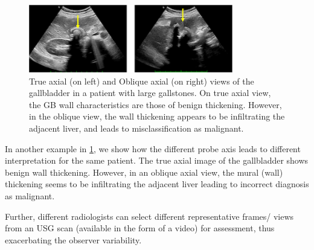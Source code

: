\begin{figure}[!ht]
    \centering
    \includegraphics[width=0.6\linewidth, height=8em]{figs/oblique_thickening.png}
    \caption[Viewpoint variation leading to incorrect diagnosis]{True axial (on left) and Oblique axial (on right) views of the gallbladder in a patient with large gallstones. On true axial view, the GB wall characteristics are those of benign thickening. However, in the oblique view, the wall thickening appears to be infiltrating the adjacent liver, and leads to misclassification as malignant. }
    \label{fig:oblique_thickening}
\end{figure}
%
%

In another example in \cref{fig:oblique_thickening}, we show how the different probe axis leads to different interpretation for the same patient. The true axial image of the gallbladder shows benign wall thickening. However, in an oblique axial view, the mural (wall) thickening seems to be infiltrating the adjacent liver leading to incorrect diagnosis as malignant.

Further, different radiologists can select different representative frames/ views from an USG scan (available in the form of a video) for assessment, thus exacerbating the observer variability. 

